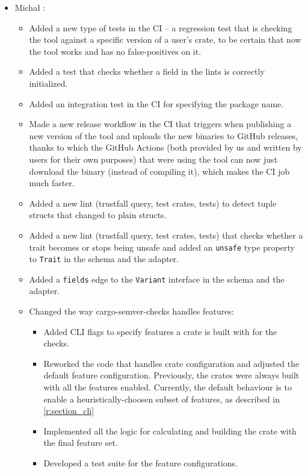 \documentclass[licencjacka,en]{pracamgr}
\begin{document}
\begin{itemize}
	\item Michał \cite{responsibilities-michal}:
		\begin{itemize}
			\item Added a new type of tests in the CI -- a regression test that is checking
				the tool against a specific version of a user's crate, to be certain that now
				the tool works and has no false-positives on it.
			\item Added a test that checks whether a field in the lints is correctly initialized.
			\item Added an integration test in the CI for specifying the package name.
			\item Made a new release workflow in the CI that triggers when publishing a new version
				of the tool and uploads the new binaries to GitHub releases, thanks to which
				the GitHub Actions (both provided by us and written by users for their own purposes)
				that were using the tool can now just download the binary (instead of compiling it),
				which makes the CI job much faster.
			\item Added a new lint (trustfall query, test crates, tests) to detect tuple structs
				that changed to plain structs.
			\item Added a new lint (trustfall query, test crates, tests) that checks whether
				a trait becomes or stops being unsafe and added an \texttt{unsafe} type property
				to \texttt{Trait} in the schema and the adapter.
			\item Added a \texttt{fields} edge to the \texttt{Variant} interface in the schema
				and the adapter.
                        \item Changed the way cargo-semver-checks handles features:
                        \begin{itemize}
                            \item Added CLI flags to specify features a crate is built with for the checks.
                            \item Reworked the code that handles crate configuration and adjusted
                                    the default feature configuration.
                                    Previously, the crates were always built with all the features enabled.
                                    Currently, the default behaviour is to enable a heuristically-choosen
                                    subset of features, as described in \ref{r:section_cli}
                            \item Implemented all the logic for calculating and building the crate
                                    with the final feature set.
                            \item Developed a test suite for the feature configurations.
                        \end{itemize}


\end{itemize}
\end{itemize}
\end{document}
